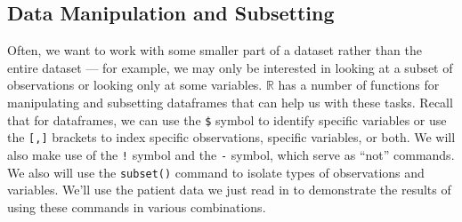 \documentclass[12pt]{article}
\begin{document}
\subsection{Data Manipulation and Subsetting}
Often, we want to work with some smaller part of a dataset rather than the entire dataset --- for example, we may only be interested in looking at a subset of observations or looking only at some variables. $\mathbb{R}$ has a number of functions for manipulating and subsetting dataframes that can help us with these tasks. Recall that for dataframes, we can use the \verb|$| symbol to identify specific variables or use the \verb|[,]| brackets to index specific observations, specific variables, or both. We will also make use of the \verb|!| symbol and the \verb|-| symbol, which serve as ``not'' commands. We also will use the \verb|subset()| command to isolate types of observations and variables. We'll use the patient data we just read in to demonstrate the results of using these commands in various combinations.
\end{document}
